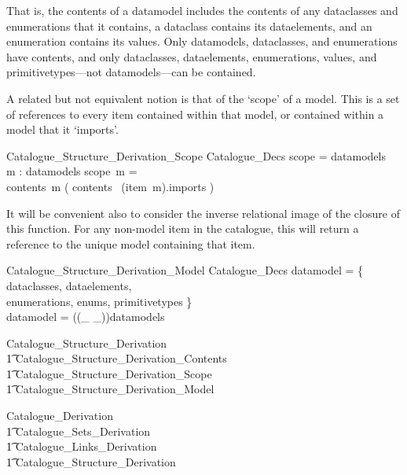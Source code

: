 \documentclass[a4paper,twoside]{article}
\def\contains{\mathrel{contains}}
\begin{document}
That is, the contents of a datamodel includes the contents of any dataclasses and enumerations that it contains, a dataclass contains its dataelements, and an enumeration contains its values.  Only datamodels, dataclasses, and enumerations have contents, and only dataclasses, dataelements, enumerations,
values, and primitivetypes---not datamodels---can be contained. 

A related but not equivalent notion is that of the `scope' of a model. This is a set of references to every item contained within that model, or contained within a model that it `imports'. 

\begin{schema}{Catalogue\_Structure\_Derivation\_Scope}
	Catalogue\_Decs
	\where
	\dom scope = datamodels 
	\\
	\forall m : datamodels \spot scope~m = \\contents~m \cup \bigcup 
	( contents~ \limg (item~m).imports \rimg )
\end{schema}

It will be convenient also to consider the inverse relational image of the closure of this function.  For any non-model item in the catalogue, this will return a reference to the unique model containing that item. 

\begin{schema}{Catalogue\_Structure\_Derivation\_Model}
	Catalogue\_Decs
	\where
	\dom datamodel = \bigcup \{ dataclasses, dataelements, \\enumerations, enums,
	primitivetypes \} \\
	datamodel = ((\_ \contains \_)\star)\inv \rres datamodels
\end{schema}

\begin{zed}
	Catalogue\_Structure\_Derivation  \\ \t1 
	Catalogue\_Structure\_Derivation\_Contents \land {} \\ \t1 
	Catalogue\_Structure\_Derivation\_Scope \land {} \\ \t1 
	Catalogue\_Structure\_Derivation\_Model   
\end{zed}

\begin{zed}
	Catalogue\_Derivation  \\ \t1 
	Catalogue\_Sets\_Derivation \land {} \\ \t1 
	Catalogue\_Links\_Derivation \land {} \\ \t1 
	Catalogue\_Structure\_Derivation 
\end{zed}
\end{document}
